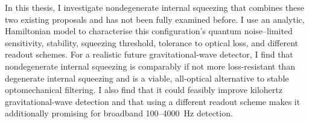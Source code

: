 In this thesis, I investigate nondegenerate internal squeezing that combines these two existing proposals and has not been fully examined before.
I use an analytic, Hamiltonian model to characterise this configuration's quantum noise--limited sensitivity, stability, squeezing threshold, tolerance to optical loss, and different readout schemes. For a realistic future gravitational-wave detector, I find that nondegenerate internal squeezing is comparably if not more loss-resistant than degenerate internal squeezing and is a viable, all-optical alternative to stable optomechanical filtering. I also find that it could feasibly improve kilohertz gravitational-wave detection and that using a different readout scheme makes it additionally promising for broadband 100--4000~Hz detection. 


